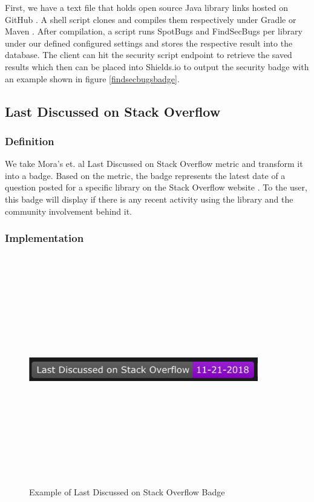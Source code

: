 \documentclass[12pt, letterpaper]{article}
\begin{document}
First, we have a text file that holds open source Java library links hosted on GitHub \cite{github}.
A shell script clones and compiles them respectively under Gradle \cite{gradle} or Maven \cite{maven}.
After compilation, a script runs SpotBugs and FindSecBugs per library under our defined configured settings
and stores the respective result
into the database. The client can hit the security script endpoint to retrieve the saved results which
then can be placed into Shields.io \cite{shields} to output the security badge with an example shown in figure \ref{findsecbugsbadge}. 


\subsection{Last Discussed on Stack Overflow}
\subsubsection{Definition}
We take Mora's et. al \cite{metrics} Last Discussed on Stack Overflow metric and transform it 
into a badge. Based on the metric, the badge represents the latest date of a question posted for a specific
library on the Stack Overflow website \cite{stackoverflow}.
To the user, this badge will display if there is any recent activity using the library and the community
involvement behind it.  

\subsubsection{Implementation}

\begin{figure}[!htb]
    \centerline{
        \includegraphics[width=10cm,height=10cm,keepaspectratio=true]{lastdiscussedbadge}
    }
    \caption{
        Example of Last Discussed on Stack Overflow Badge
    }
    \label{lastdiscussed}
\end{figure}
\end{document}
